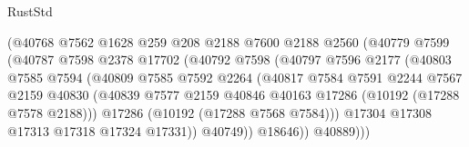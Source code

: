 \begin{lexlean}{RustStd}
\begin{coremodule}
                                (@40768
                                  @7562
                                  @1628
                                  @259
                                  @208
                                  @2188
                                  @7600
                                  @2188
                                  @2560
                                  (@40779
                                    @7599
                                    (@40787
                                      @7598
                                      @2378
                                      @17702
                                      (@40792
                                        @7598
                                        (@40797
                                          @7596
                                          @2177
                                          (@40803
                                            @7585
                                            @7594
                                            (@40809
                                              @7585
                                              @7592
                                              @2264
                                              (@40817
                                                @7584
                                                @7591
                                                @2244
                                                @7567
                                                @2159
                                                @40830
                                                (@40839
                                                  @7577
                                                  @2159
                                                  @40846
                                                  @40163
                                                  @17286
                                                  (@10192 (@17288 @7578 @2188)))
                                                @17286
                                                (@10192 (@17288 @7568 @7584)))
                                              @17304
                                              @17308
                                              @17313
                                              @17318
                                              @17324
                                              @17331))
                                          @40749))
                                      @18646))
                                  @40889)))

\end{coremodule}
\end{lexlean}
